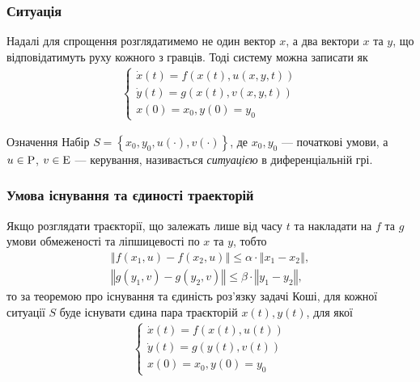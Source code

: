 \documentclass[10pt,pdf]{beamer}
\renewcommand{\d}[1]{\dot{#1}}
\renewcommand{\l}{\left}
\renewcommand{\r}{\right}
\newcommand{\norm}[1]{\left\Vert #1 \right\Vert}
\begin{document}
    \begin{frame}
        \frametitle{Ситуація}
    
        Надалі для спрощення розглядатимемо не один вектор $x$, а два вектори $x$ та $y$, що відповідатимуть руху кожного з гравців. Тоді
        систему можна записати як
        \begin{gather*}
            \begin{cases}
                \d{x}(t) = f(x(t), u(x, y, t)) \\
                \d{y}(t) = g(x(t), v(x, y, t)) \\
                x(0) = x_0, y(0) = y_0
            \end{cases}
        \end{gather*}

        \begin{block}{Означення}
            Набір $S = \l\{x_0, y_0, u(\cdot), v(\cdot) \r\}$, де $x_0, y_0$ --- початкові умови, а $u \in \rm P$, $v \in \rm E$ --- керування, 
            називається \emph{ситуацією} в диференціальній грі.
        \end{block}

        
    \end{frame}
    \begin{frame}
        \frametitle{Умова існування та єдиності траекторій}
    
        Якщо розглядати траєкторії, що залежать лише від часу $t$ та накладати на $f$ та $g$ умови
        обмеженості та ліпшицевості по $x$ та $y$, тобто
        \begin{gather*}
            \norm{f(x_1, u) - f(x_2, u)} \leq \alpha \cdot \norm{x_1 - x_2}, \\
            \norm{g(y_1, v) - g(y_2, v)} \leq \beta \cdot \norm{y_1 - y_2},
        \end{gather*}
        то за теоремою про існування та єдиність роз'язку задачі Коші, для кожної ситуації $S$ буде існувати єдина пара траєкторій $x(t), y(t)$,
        для якої 
        \begin{gather*}
            \begin{cases}
                \d{x}(t) = f(x(t), u(t)) \\
                \d{y}(t) = g(y(t), v(t)) \\
                x(0) = x_0, y(0) = y_0
            \end{cases}
        \end{gather*}
    \end{frame}
\end{document}
